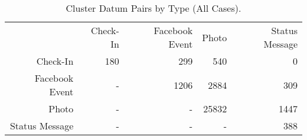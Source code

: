 \begin{table}[htp]
	\begin{center}
	\caption{Cluster Datum Pairs by Type (All Cases).}
	\label{tab:table_all_xtype_cluster}
		\begin{tabular}{r r r r r }
		\toprule
			 & Check-In & Facebook Event & Photo & Status Message\\
			Check-In & 180 & 299 & 540 & 0\\
			Facebook Event & - & 1206 & 2884 & 309\\
			Photo & - & - & 25832 & 1447\\
			Status Message & - & - & - & 388\\
		\bottomrule
		\end{tabular}
	\end{center}
\end{table}
